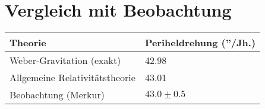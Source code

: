\section{Vergleich mit Beobachtung}
\begin{table}[h]
\centering
\begin{tabular}{|l|l|}
\hline
\textbf{Theorie} & \textbf{Periheldrehung (''/Jh.)} \\ \hline
Weber-Gravitation (exakt) & 42.98 \\ \hline
Allgemeine Relativitätstheorie & 43.01 \\ \hline
Beobachtung (Merkur) & $43.0 \pm 0.5$ \\ \hline
\end{tabular}
\end{table}